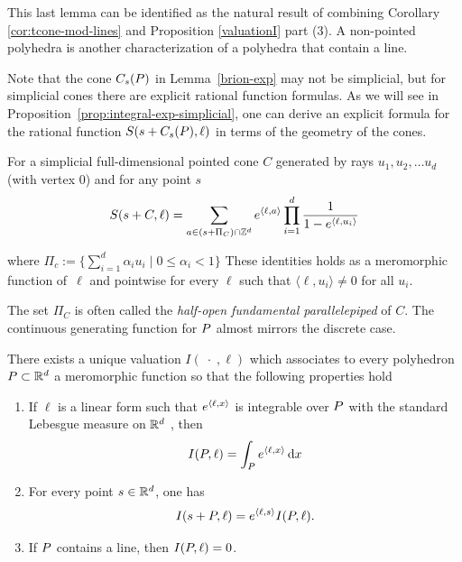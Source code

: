 This last lemma can be identified as the natural result of combining Corollary \ref{cor:tcone-mod-lines} and Proposition \ref{valuationI} part (3). A non-pointed polyhedra is another characterization of  a polyhedra that contain a line.


Note that the cone $C_s({ P})$ in Lemma~\ref{brion-exp} may not be simplicial, but for simplicial cones there are explicit rational function formulas. As we will see in Proposition~\ref{prop:integral-exp-simplicial}, one can derive an explicit formula for 
the rational function $S(s+C_s({ P}),\ell)$ in terms of the geometry of the cones.

\begin{proposition} 
  \label{prop:summation-exp-simplicial}
  For a simplicial full-dimensional pointed cone $C$ generated by rays $u_1,u_2,\dots u_d$ (with vertex $0$) and for any point $s$
\begin{equation*}
S(s+C,\ell)
=\sum_{a \in (s+\Pi_C) \cap {\mathbb Z}^d} e^{\langle \ell, a
  \rangle} \prod_{i=1}^d \frac1{1- e^{\langle \ell, u_i \rangle}}
\end{equation*}

where $\Pi_c := \{ \sum_{i=1}^d \alpha_i u_i \mid 0 \leq \alpha_i < 1\}$
These identities holds as a meromorphic function of~$\ell$ 
and pointwise for every $\ell$ such that $\langle \ell, u_i \rangle \neq 0$ for
all $u_i$.
\end{proposition}

The set $\Pi_C$ is often called the \emph{half-open fundamental parallelepiped} of $C$. The continuous generating function for ${ P}$ almost mirrors the discrete case. 

\begin{proposition}\label{valuationII}
There exists a unique valuation  $I(\;\cdot\;, \ell)$ which  associates  to every polyhedron
${ P}\subset {\mathbb R}^d$ a meromorphic function so that the following properties hold 

\begin{enumerate}
\item If $\ell$ is a linear form such that $e^{{\langle} \ell, x {\rangle}}$ is integrable over ${ P}$ with the standard Lebesgue measure on ${\mathbb R}^d$ , then 
\[ I({ P},\ell) = \int_{ P} e^{{\langle} \ell, x {\rangle}} \,\mathrm{d} x\]
\item For every point $s \in {\mathbb R}^d$, one has
\[I(s+{ P}, \ell) = e^{{\langle} \ell, s {\rangle}}I({ P},\ell).\]
\item If ${ P}$ contains a line, then $I({ P}, \ell) = 0$.
\end{enumerate}
\end{proposition}


